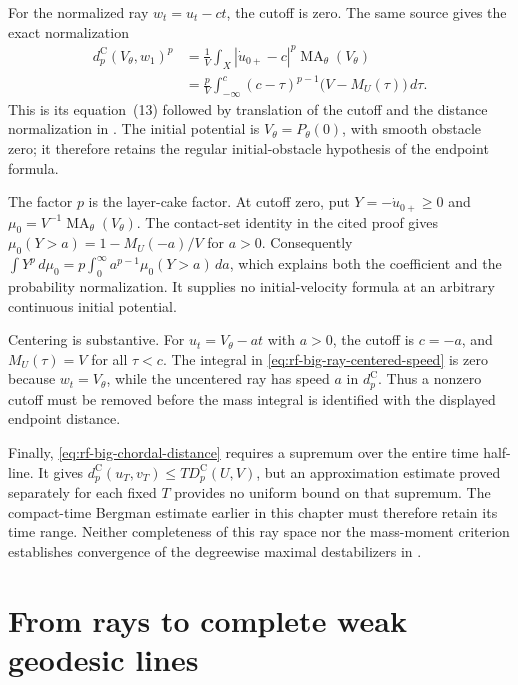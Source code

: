 For the normalized ray $w_t=u_t-ct$, the cutoff is zero.  The same
source gives the exact normalization
\[
\tag{65.48}
\label{eq:rf-big-ray-centered-speed}
 \begin{split}
 d_p^{\mathrm C}(V_\theta,w_1)^p
 &=\frac1V\int_X|\dot u_{0+}-c|^p
                  \operatorname{MA}_\theta(V_\theta)\\
 &=\frac pV\int_{-\infty}^{c}(c-\tau)^{p-1}
                         \bigl(V-M_U(\tau)\bigr)\,d\tau.
 \end{split}
\]
This is its equation~(13) followed by translation of the cutoff and
the distance normalization in
.  The initial potential is
$V_\theta=P_\theta(0)$, with smooth obstacle zero; it therefore retains
the regular initial-obstacle hypothesis of the endpoint formula.

The factor $p$ is the layer-cake factor.  At cutoff zero, put
$Y=-\dot u_{0+}\geq0$ and
$\mu_0=V^{-1}\operatorname{MA}_\theta(V_\theta)$.
The contact-set identity in the cited proof gives
$\mu_0(Y>a)=1-M_U(-a)/V$ for $a>0$.
Consequently $\int Y^p\,d\mu_0
=p\int_0^\infty a^{p-1}\mu_0(Y>a)\,da$,
which explains both the coefficient and the probability normalization.
It supplies no initial-velocity formula at an arbitrary continuous
initial potential.

Centering is substantive.  For $u_t=V_\theta-at$ with $a>0$, the cutoff
is $c=-a$, and $M_U(\tau)=V$ for all $\tau<c$.  The integral in
\eqref{eq:rf-big-ray-centered-speed} is zero because $w_t=V_\theta$,
while the uncentered ray has speed $a$ in $d_p^{\mathrm C}$.
Thus a nonzero cutoff must be removed before the mass integral is
identified with the displayed endpoint distance.

Finally, \eqref{eq:rf-big-chordal-distance} requires a supremum over
the entire time half-line.  It gives
$d_p^{\mathrm C}(u_T,v_T)\leq T D_p^{\mathrm C}(U,V)$,
but an approximation estimate proved separately for each fixed $T$
provides no uniform bound on that supremum.  The compact-time Bergman
estimate earlier in this chapter must therefore retain its time range.
Neither completeness of this ray space nor the mass-moment criterion
establishes convergence of the degreewise maximal destabilizers in
.

\clearpage

\section{From rays to complete weak geodesic lines}
\label{sec:rf-complete-weak-lines}

